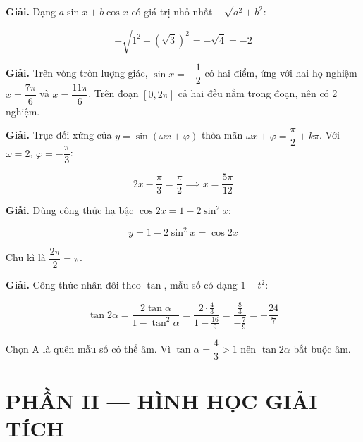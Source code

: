 \documentclass[11pt, a4paper]{article}
\begin{document}
\vspace{0.3cm}
\begin{dapan}[6 — Đáp án A]

\textbf{Giải.} Dạng $a\sin x + b\cos x$ có giá trị nhỏ nhất $-\sqrt{a^2 + b^2}$:

$$-\sqrt{1^2 + (\sqrt{3})^2} = -\sqrt{4} = -2$$


\end{dapan}
\vspace{0.3cm}
\begin{dapan}[7 — Đáp án C]

\textbf{Giải.} Trên vòng tròn lượng giác, $\sin x = -\dfrac{1}{2}$ có hai điểm, ứng với hai họ nghiệm $x = \dfrac{7\pi}{6}$ và $x = \dfrac{11\pi}{6}$. Trên đoạn $[0, 2\pi]$ cả hai đều nằm trong đoạn, nên có 2 nghiệm.


\end{dapan}
\vspace{0.3cm}
\begin{dapan}[8 — Đáp án D]

\textbf{Giải.} Trục đối xứng của $y = \sin(\omega x + \varphi)$ thỏa mãn $\omega x + \varphi = \dfrac{\pi}{2} + k\pi$. Với $\omega = 2$, $\varphi = -\dfrac{\pi}{3}$:

$$2x - \dfrac{\pi}{3} = \dfrac{\pi}{2} \implies x = \dfrac{5\pi}{12}$$


\end{dapan}
\vspace{0.3cm}
\begin{dapan}[9 — Đáp án B]

\textbf{Giải.} Dùng công thức hạ bậc $\cos 2x = 1 - 2\sin^2 x$:

$$y = 1 - 2\sin^2 x = \cos 2x$$

Chu kì là $\dfrac{2\pi}{2} = \pi$.


\end{dapan}
\vspace{0.3cm}
\begin{dapan}[10 — Đáp án C]

\textbf{Giải.} Công thức nhân đôi theo $\tan$, mẫu số có dạng $1 - t^2$:

$$\tan 2\alpha = \dfrac{2\tan\alpha}{1 - \tan^2\alpha} = \dfrac{2 \cdot \frac{4}{3}}{1 - \frac{16}{9}} = \dfrac{\frac{8}{3}}{-\frac{7}{9}} = -\dfrac{24}{7}$$

 Chọn A là quên mẫu số có thể âm. Vì $\tan\alpha = \dfrac{4}{3} > 1$ nên $\tan 2\alpha$ bắt buộc âm.

\section{PHẦN II — HÌNH HỌC GIẢI TÍCH}


\end{dapan}
\end{document}
